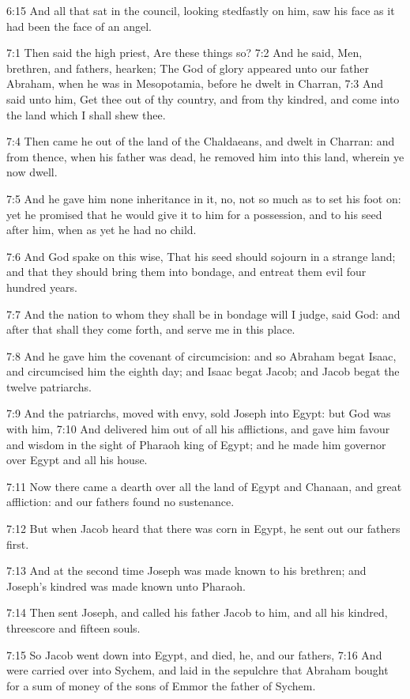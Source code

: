 6:15 And all that sat in the council, looking stedfastly on him, saw his face as it had been the face of an angel.

7:1 Then said the high priest, Are these things so?  7:2 And he said, Men, brethren, and fathers, hearken; The God of glory appeared unto our father Abraham, when he was in Mesopotamia, before he dwelt in Charran, 7:3 And said unto him, Get thee out of thy country, and from thy kindred, and come into the land which I shall shew thee.

7:4 Then came he out of the land of the Chaldaeans, and dwelt in Charran: and from thence, when his father was dead, he removed him into this land, wherein ye now dwell.

7:5 And he gave him none inheritance in it, no, not so much as to set his foot on: yet he promised that he would give it to him for a possession, and to his seed after him, when as yet he had no child.

7:6 And God spake on this wise, That his seed should sojourn in a strange land; and that they should bring them into bondage, and entreat them evil four hundred years.

7:7 And the nation to whom they shall be in bondage will I judge, said God: and after that shall they come forth, and serve me in this place.

7:8 And he gave him the covenant of circumcision: and so Abraham begat Isaac, and circumcised him the eighth day; and Isaac begat Jacob; and Jacob begat the twelve patriarchs.

7:9 And the patriarchs, moved with envy, sold Joseph into Egypt: but God was with him, 7:10 And delivered him out of all his afflictions, and gave him favour and wisdom in the sight of Pharaoh king of Egypt; and he made him governor over Egypt and all his house.

7:11 Now there came a dearth over all the land of Egypt and Chanaan, and great affliction: and our fathers found no sustenance.

7:12 But when Jacob heard that there was corn in Egypt, he sent out our fathers first.

7:13 And at the second time Joseph was made known to his brethren; and Joseph's kindred was made known unto Pharaoh.

7:14 Then sent Joseph, and called his father Jacob to him, and all his kindred, threescore and fifteen souls.

7:15 So Jacob went down into Egypt, and died, he, and our fathers, 7:16 And were carried over into Sychem, and laid in the sepulchre that Abraham bought for a sum of money of the sons of Emmor the father of Sychem.

